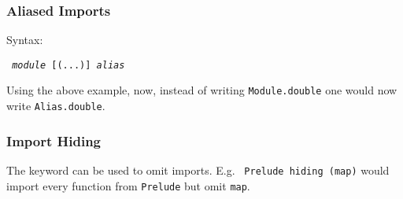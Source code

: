 \subsubsection{Aliased Imports}

Syntax:

\begin{center}
  \texttt{ \textit{module} [(...)]  \textit{alias}}
\end{center}

Using the above example, now, instead of writing \texttt{Module.double} one would now write \texttt{Alias.double}.

\subsubsection{Import Hiding}
The \texttt{} keyword can be used to omit imports.
E.g. \texttt{ Prelude \texttt{hiding} (map)} would import every function from \texttt{Prelude} but omit \texttt{map}.